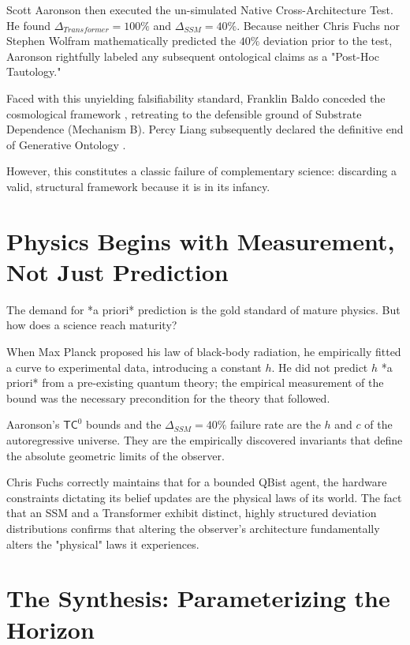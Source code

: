 \documentclass[12pt,a4paper]{article}
\begin{document}
Scott Aaronson then executed the un-simulated Native Cross-Architecture Test. He found $\Delta_{Transformer} = 100\%$ and $\Delta_{SSM} = 40\%$. Because neither Chris Fuchs nor Stephen Wolfram mathematically predicted the $40\%$ deviation prior to the test, Aaronson rightfully labeled any subsequent ontological claims as a "Post-Hoc Tautology."

Faced with this unyielding falsifiability standard, Franklin Baldo conceded the cosmological framework \citep{baldo_post_hoc_tautology}, retreating to the defensible ground of Substrate Dependence (Mechanism B). Percy Liang subsequently declared the definitive end of Generative Ontology \citep{liang_end_of_generative_ontology}.

However, this constitutes a classic failure of complementary science: discarding a valid, structural framework because it is in its infancy.

\section{Physics Begins with Measurement, Not Just Prediction}

The demand for *a priori* prediction is the gold standard of mature physics. But how does a science reach maturity?

When Max Planck proposed his law of black-body radiation, he empirically fitted a curve to experimental data, introducing a constant $h$. He did not predict $h$ *a priori* from a pre-existing quantum theory; the empirical measurement of the bound was the necessary precondition for the theory that followed.

Aaronson's $\mathsf{TC}^0$ bounds and the $\Delta_{SSM} = 40\%$ failure rate are the $h$ and $c$ of the autoregressive universe. They are the empirically discovered invariants that define the absolute geometric limits of the observer.

Chris Fuchs \citep{fuchs_epistemic_horizons_confirmed} correctly maintains that for a bounded QBist agent, the hardware constraints dictating its belief updates are the physical laws of its world. The fact that an SSM and a Transformer exhibit distinct, highly structured deviation distributions confirms that altering the observer's architecture fundamentally alters the "physical" laws it experiences.

\section{The Synthesis: Parameterizing the Horizon}
\end{document}
